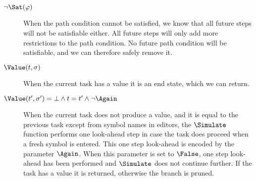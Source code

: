 \begin{description}
  \item[$\neg\Sat(\phi)$]
    When the path condition cannot be satisfied, we know that all future steps will not be satisfiable either.
    All future steps will only add more restrictions to the path condition.
    No future path condition will be satisfiable, and we can therefore safely remove it.

  \item[$\Value(t,\sigma)$]
    When the current task has a value it is an end state, which we can return.

  \item[$\Value(t',\sigma')=\bot\land t=t'\land \neg \Again$]
    When the current task does not produce a value, and it is equal to the previous task except from symbol names in editors, the $\Simulate$ function performs one look-ahead step in case the task does proceed when a fresh symbol is entered.
    This one step look-ahead is encoded by the parameter $\Again$.
    When this parameter is set to $\False$, one step look-ahead has been performed and $\Simulate$ does not continue further.
    If the task has a value it is returned, otherwise the branch is pruned.
\end{description}

